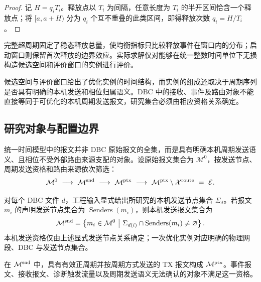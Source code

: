 \documentclass[UTF8,a4paper,twoside,zihao=-4]{ctexart}
\numberwithin{equation}{section}
\numberwithin{figure}{section}
\numberwithin{table}{section}
\theoremstyle{definition}
\newcommand{\Mset}{\mathcal{M}}
\newcommand{\Eset}{\mathcal{E}}
\newcommand{\Xset}{\mathcal{X}}
\numberwithin{algocf}{section}
\begin{document}
\begin{proof}
记 $H=q_iT_i$。释放点以 $T_i$ 为间隔，任意长度为 $T_i$ 的半开区间恰含一个释放点；将 $[a,a+H)$ 分为 $q_i$ 个互不重叠的此类区间，即得释放次数 $q_i=H/T_i$。
\end{proof}

完整超周期固定了稳态释放总量，使均衡指标只比较释放事件在窗口内的分布；启动窗口则保留首次释放的边界效应。实际求解仅对能够在统一整数时间单位下无损构造候选空间和评价窗口的实例进行评价。

候选空间与评价窗口给出了优化实例的时间结构，而实例的组成还取决于周期序列是否具有明确的本机发送和相位归属语义。DBC 中的接收、事件及路由对象不能直接等同于可优化的本机周期发送报文，研究集合必须由相应资格关系确定。

\subsection{研究对象与配置边界}
\label{sec:eligible-set}

统一时间模型中的报文并非 DBC 原始报文的全集，而是具有明确本机周期发送语义、且相位不受外部路由来源支配的对象。设原始报文集合为 $\Mset^{0}$，按发送节点、周期发送资格和路由来源依次筛选：
\begin{equation}
 \Mset^{0}
 \ \longrightarrow\
 \Mset^{\rm snd}
 \ \longrightarrow\
 \Mset^{\rm ptx}
 \ \longrightarrow\
 \Mset^{\rm ptx}\setminus\Xset^{\rm route}
 \ =\ \Eset .
\label{eq:eligible-chain}
\end{equation}

对每个 DBC 文件 $d$，工程输入显式给出所研究的本机发送节点集合 $\Sigma_d$。若报文 $m_i$ 的声明发送节点集合为 $\operatorname{Senders}(m_i)$，则本机发送报文集合为
\begin{equation}
 \Mset^{\rm snd}
 =
 \left\{m_i\in\Mset^{0}\ \middle|\
 \Sigma_{d(i)}\cap\operatorname{Senders}(m_i)\ne\varnothing\right\}.
\label{eq:selected-sender-set}
\end{equation}
本机发送资格仅由上述显式发送节点关系确定；一次优化实例对应明确的物理网段、DBC 与发送节点集合。

在 $\Mset^{\rm snd}$ 中，具有有效正周期并按周期方式发送的 TX 报文构成 $\Mset^{\rm ptx}$。事件报文、接收报文、诊断触发流量以及周期发送语义无法确认的对象不满足这一资格。
\end{document}
